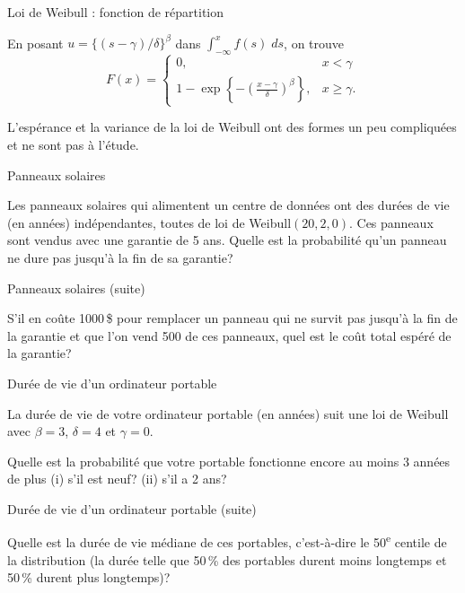 \documentclass{BeamerTemplate}
\newcommand{\cibleReponse}{}
\newcommand{\lienreponse}[1]{\gdef\cibleReponse{#1}}
\begin{document}
\begin{frame}{Loi de Weibull : fonction de répartition}

En posant $u=\{(s-\gamma)/\delta\}^\beta$ dans $\int_{-\infty}^xf(s)\;ds$, on trouve
$$F(x)=\left\{\begin{array}{ll}
0, & x<\gamma\\
1-\exp\left\{-\left(\frac{x-\gamma}{\delta}\right)^\beta\right\}, & x\ge\gamma.
\end{array}\right.$$

\vspace{0.4in}
L'espérance et la variance de la loi de Weibull ont des formes un peu compliquées et ne sont pas à l'étude.

\end{frame}


\begin{frame}[t,label=exsolaire]{Panneaux solaires}

{\small
Les panneaux solaires qui alimentent un centre de données ont des durées de vie (en années)
indépendantes, toutes de loi de Weibull$(20,2,0)$. Ces panneaux sont vendus avec une garantie
de 5 ans. Quelle est la probabilité qu'un panneau ne dure pas jusqu'à la fin de sa garantie?}
\lienreponse{rep-ex4}
\end{frame}


\begin{frame}[t]{Panneaux solaires (suite)}

{\small
S'il en coûte 1000\,\$ pour remplacer un panneau qui ne survit pas jusqu'à la fin de la garantie
et que l'on vend 500 de ces panneaux, quel est le coût total espéré de la garantie?}
\lienreponse{rep-ex4}
\end{frame}


\begin{frame}[t,label=exportable]{Durée de vie d'un ordinateur portable}

{\small
La durée de vie de votre ordinateur portable (en années) suit une loi de Weibull avec $\beta=3$,
$\delta=4$ et $\gamma=0$.

Quelle est la probabilité que votre portable fonctionne encore au moins 3 années de plus
(i) s'il est neuf? (ii) s'il a 2 ans?
}
\lienreponse{rep-ex4}
\end{frame}


\begin{frame}[t]{Durée de vie d'un ordinateur portable (suite)}

{\small
Quelle est la durée de vie médiane de ces portables, c'est-à-dire le 50\textsuperscript{e} centile
de la distribution (la durée telle que 50\,\% des portables durent moins longtemps et 50\,\% durent
plus longtemps)?}
\lienreponse{rep-ex4}
\end{frame}
\end{document}
